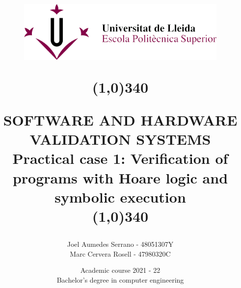 \title{
	\begin{center}
	\vspace{3cm}
	\includegraphics[width=11cm, height=3cm]{images/logo_eps.png}
	\end{center}
	\begin{center}
	\line(1,0){340}
	\end{center}		
	SOFTWARE AND HARDWARE VALIDATION SYSTEMS\\
	\vspace{2mm}
	\Large Practical case 1: Verification of programs with Hoare logic and symbolic execution\\
	\line(1,0){340}
	\vspace{2.5cm}
	}

\author{Joel Aumedes Serrano - 48051307Y \\ Marc Cervera Rosell - 47980320C \vspace{1cm}}


\date{Academic course 2021 - 22\vspace{0.5cm} \\Bachelor's degree in computer engineering}